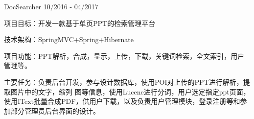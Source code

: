 \vspace{-3.0mm}

\begin{cventries}
\vspace{-0.7mm}

\cvexperience
{ DocSearcher}
{10/2016 - 04/2017}
{
    \begin{cvitems}
    \item {项目目标：开发一款基于单页PPT的检索管理平台}
    \item {技术架构：SpringMVC+Spring+Hibernate}
    \item {项目功能：PPT解析，合成，显示，上传，下载，关键词检索，全文索引，用户管理等。}
    \item {主要任务：负责后台开发，参与设计数据库，使用POI对上传的PPT进行解析，提取图片中的文字，缩列 图等信息，使用Lucene进行分词，用户选定指定ppt页面，使用IText批量合成PDF，供用户下载，以及负责用户管理模块，登录注册等和参加部分管理员后台界面的设计。}
    \end{cvitems}
}

\end{cventries}